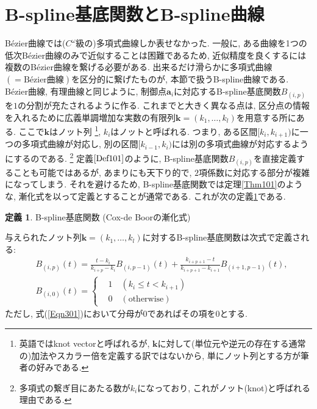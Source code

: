 \documentclass{jsarticle}
\theoremstyle{definition}%
\newtheorem{defn}[thm]{定義}
\begin{document}
\section{B-spline基底関数とB-spline曲線}
B\'ezier曲線では($C^\omega$級\footnotemark の)多項式曲線しか表せなかった.
一般に, ある曲線を1つの低次B\'ezier曲線のみで近似することは困難であるため, 近似精度を良くするには複数のB\'ezier曲線を繋げる必要がある.
出来るだけ滑らかに多項式曲線$(=\text{B\'ezier曲線})$を区分的に繋げたものが, 本節で扱うB-spline曲線である.
B\'ezier曲線, 有理曲線と同じように, 制御点$\bm{a}_i$に対応するB-spline基底関数$B_{(i,p)}$を$1$の分割が充たされるように作る.
これまでと大きく異なる点は, 区分点の情報を入れるために広義単調増加な実数の有限列$\bm{k}=(k_1, \dots , k_l)$を用意する所にある.
ここで$\bm{k}$はノット列%
\footnote{英語ではknot vectorと呼ばれるが, $\bm{k}$に対して(単位元や逆元の存在する通常の)加法やスカラー倍を定義する訳ではないから, 単にノット列とする方が筆者の好みである.
}, $k_{i}$はノットと呼ばれる.
つまり, ある区間$[k_{i}, k_{i+1})$に一つの多項式曲線が対応し, 別の区間$[k_{i-1}, k_{i})$には別の多項式曲線が対応するようにするのである.%
\footnote{多項式の繋ぎ目にあたる数が$k_{i}$になっており, これがノット(knot)と呼ばれる理由である.}
定義$\ref{Def101}$のように, B-spline基底関数$B_{(i,p)}$を直接定義することも可能ではあるが, あまりにも天下り的で, $2$項係数に対応する部分が複雑になってしまう.
それを避けるため, B-spline基底関数では定理\ref{Thm101}のような, 漸化式を以って定義とすることが通常である.
これが次の定義\ref{Def301}である.
\begin{screen}
	\begin{defn}
        \label{Def301}
		B-spline基底関数 (Cox-de Boorの漸化式)

		与えられたノット列$\bm{k}=(k_1, \dots , k_l)$に対するB-spline基底関数は次式で定義される:
		\begin{align}
			\label{Eqn301}
			&{B}_{(i,p)}(t)
			=
			\frac{t-k_{i}}{k_{i+p}-k_{i}}{B}_{(i,p-1)}(t)
			+\frac{k_{i+p+1}-t}{k_{i+p+1}-k_{i+1}}{B}_{(i+1,p-1)}(t), \\
			\label{Eqn302}
			&{B}_{(i,0)} (t)
			=
			\begin{cases}
				&1\quad (k_{i}\le t< k_{i+1})\\
				&0\quad (\text{otherwise})
			\end{cases}
		\end{align}
		ただし, 式(\ref{Eqn301})において分母が$0$であればその項を$0$とする.
	\end{defn}
\end{screen}
\end{document}
